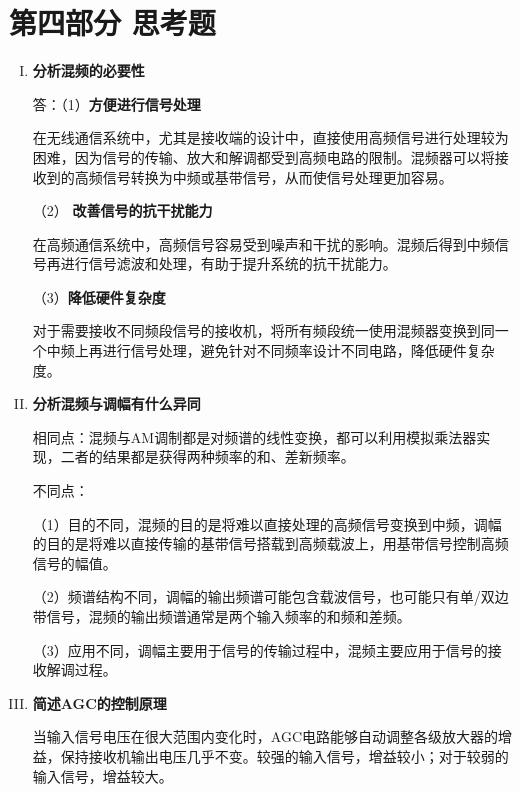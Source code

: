 \documentclass[UTF8]{ctexart}
\begin{document}
\section{第四部分 \texorpdfstring{\quad}{} 思考题}
\begin{enumerate}[I.]

    \item \textbf{分析混频的必要性}

    答：（1）\textbf{方便进行信号处理}
    
    在无线通信系统中，尤其是接收端的设计中，直接使用高频信号进行处理较为困难，因为信号的传输、放大和解调都受到高频电路的限制。混频器可以将接收到的高频信号转换为中频或基带信号，从而使信号处理更加容易。

    （2） \textbf{改善信号的抗干扰能力}

    在高频通信系统中，高频信号容易受到噪声和干扰的影响。混频后得到中频信号再进行信号滤波和处理，有助于提升系统的抗干扰能力。
    
    （3）\textbf{降低硬件复杂度}

    对于需要接收不同频段信号的接收机，将所有频段统一使用混频器变换到同一个中频上再进行信号处理，避免针对不同频率设计不同电路，降低硬件复杂度。

    \item \textbf{分析混频与调幅有什么异同}

    相同点：混频与AM调制都是对频谱的线性变换，都可以利用模拟乘法器实现，二者的结果都是获得两种频率的和、差新频率。
    
    不同点：
    
    （1）目的不同，混频的目的是将难以直接处理的高频信号变换到中频，调幅的目的是将难以直接传输的基带信号搭载到高频载波上，用基带信号控制高频信号的幅值。

    （2）频谱结构不同，调幅的输出频谱可能包含载波信号，也可能只有单/双边带信号，混频的输出频谱通常是两个输入频率的和频和差频。

    （3）应用不同，调幅主要用于信号的传输过程中，混频主要应用于信号的接收解调过程。

    \item \textbf{简述AGC的控制原理}

    当输入信号电压在很大范围内变化时，AGC电路能够自动调整各级放大器的增益，保持接收机输出电压几乎不变。较强的输入信号，增益较小；对于较弱的输入信号，增益较大。

\end{enumerate}
\end{document}
